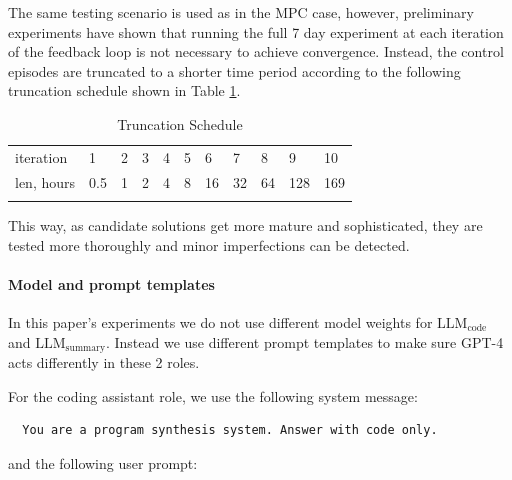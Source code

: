 The same testing scenario is used as in the MPC case, however, preliminary experiments have shown that running the full 7 day experiment at each iteration of the feedback loop is not necessary to achieve convergence. Instead, the control episodes are truncated to a shorter time period according to the following truncation schedule shown in Table \ref{tab:truncation-schedule}.

\begin{table}[H]
\centering
\caption{Truncation Schedule}
\label{tab:truncation-schedule}       %
\begin{tabular}{lllllllllll}
\hline\noalign{\smallskip}
iteration & 1 & 2 & 3 & 4 & 5 & 6 & 7 & 8 & 9 & 10 \\
\noalign{\smallskip}\hline\noalign{\smallskip}
len, hours & 0.5 & 1 & 2 & 4 & 8 & 16 & 32 & 64 & 128 & 169 \\
\noalign{\smallskip}\hline
\end{tabular}
\end{table}

This way, as candidate solutions get more mature and sophisticated, they are tested more thoroughly and minor imperfections can be detected.

\paragraph{Model and prompt templates} In this paper’s experiments we do not use different model weights for $\text{LLM}_\text{code}$ and $\text{LLM}_\text{summary}$.
Instead we use different prompt templates to make sure GPT-4 acts differently in these 2 roles.

For the coding assistant role, we use the following system message:

\begin{lstlisting}
  You are a program synthesis system. Answer with code only.
\end{lstlisting}

and the following user prompt:

